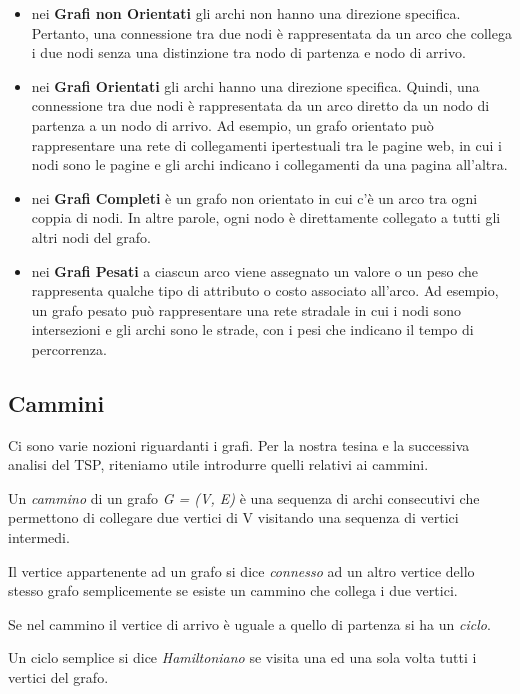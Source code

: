 \begin{itemize}
    \item nei \textbf{Grafi non Orientati} gli archi non hanno una direzione specifica. Pertanto, una connessione tra due nodi è rappresentata da un arco che collega i due nodi senza una distinzione tra nodo di partenza e nodo di arrivo. 

    \item nei \textbf{Grafi Orientati} gli archi hanno una direzione specifica. Quindi, una connessione tra due nodi è rappresentata da un arco diretto da un nodo di partenza a un nodo di arrivo. Ad esempio, un grafo orientato può rappresentare una rete di collegamenti ipertestuali tra le pagine web, in cui i nodi sono le pagine e gli archi indicano i collegamenti da una pagina all'altra.

    \item nei \textbf{Grafi Completi} è un grafo non orientato in cui c'è un arco tra ogni coppia di nodi. In altre parole, ogni nodo è direttamente collegato a tutti gli altri nodi del grafo.

    \item nei \textbf{Grafi Pesati} a ciascun arco viene assegnato un valore o un peso che rappresenta qualche tipo di attributo o costo associato all'arco. Ad esempio, un grafo pesato può rappresentare una rete stradale in cui i nodi sono intersezioni e gli archi sono le strade, con i pesi che indicano il tempo di percorrenza.
\end{itemize}

\subsection{Cammini}
Ci sono varie nozioni riguardanti i grafi. Per la nostra tesina e la successiva analisi del TSP, riteniamo utile introdurre quelli relativi ai cammini. 

Un \textit{cammino} di un grafo \textit{G = (V, E)} è una sequenza di archi consecutivi che permettono di collegare due vertici di V visitando una sequenza di vertici intermedi. 

Il vertice appartenente ad un grafo si dice \textit{connesso} ad un altro vertice dello stesso grafo semplicemente se esiste un cammino che collega i due vertici.

Se nel cammino il vertice di arrivo è uguale a quello di partenza si ha un \textit{ciclo}. 

Un ciclo semplice si dice \textit{Hamiltoniano} se visita una ed una sola volta tutti i vertici del grafo.

